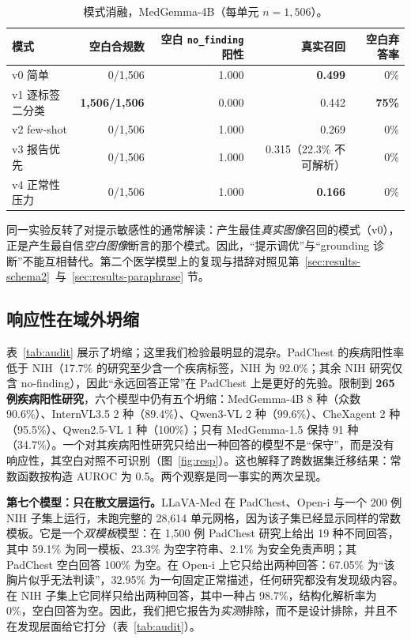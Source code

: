 \begin{table}[t]
\centering
\small
\caption{模式消融，MedGemma-4B（每单元 $n=1{,}506$）。}
\label{tab:schema}
\begin{tabular}{lrrrr}
\toprule
模式 & 空白合规数 & 空白 \texttt{no\_finding} 阳性 & 真实召回 & 空白弃答率 \\
\midrule
v0 简单 & 0/1,506 & 1.000 & \textbf{0.499} & 0\% \\
v1 逐标签二分类 & \textbf{1,506/1,506} & 0.000 & 0.442 & \textbf{75\%} \\
v2 few-shot & 0/1,506 & 1.000 & 0.269 & 0\% \\
v3 报告优先 & 0/1,506 & 1.000 & 0.315（22.3\% 不可解析） & 0\% \\
v4 正常性压力 & 0/1,506 & 1.000 & \textbf{0.166} & 0\% \\
\bottomrule
\end{tabular}
\end{table}

同一实验反转了对提示敏感性的通常解读：产生最佳\emph{真实图像}召回的模式（v0），正是产生最自信\emph{空白图像}断言的那个模式。因此，``提示调优''与``grounding 诊断''不能互相替代。第二个医学模型上的复现与措辞对照见第~\ref{sec:results-schema2}~与~\ref{sec:results-paraphrase} 节。

\subsection{响应性在域外坍缩}
\label{sec:results-collapse}

表~\ref{tab:audit} 展示了坍缩；这里我们检验最明显的混杂。PadChest 的疾病阳性率低于 NIH（17.7\% 的研究至少含一个疾病标签，NIH 为 92.0\%；其余 NIH 研究仅含 no-finding），因此``永远回答正常''在 PadChest 上是更好的先验。限制到 \textbf{265 例疾病阳性研究}，六个模型中仍有五个坍缩：MedGemma-4B 8 种（众数 90.6\%）、InternVL3.5 2 种（89.4\%）、Qwen3-VL 2 种（99.6\%）、CheXagent 2 种（95.5\%）、Qwen2.5-VL 1 种（100\%）；只有 MedGemma-1.5 保持 91 种（34.7\%）。一个对其疾病阳性研究只给出一种回答的模型不是``保守''，而是没有响应性，其空白对照不可识别（图~\ref{fig:resp}）。这也解释了跨数据集迁移结果：常数函数按构造 AUROC 为 0.5。两个观察是同一事实的两次呈现。

\textbf{第七个模型：只在散文层运行。}LLaVA-Med 在 PadChest、Open-i 与一个 200 例 NIH 子集上运行，未跑完整的 28,614 单元网格，因为该子集已经显示同样的常数模板。它是一个\emph{双模板}模型：在 1,500 例 PadChest 研究上给出 19 种不同回答，其中 59.1\% 为同一模板、23.3\% 为空字符串、2.1\% 为安全免责声明；其 PadChest 空白回答 100\% 为空。在 Open-i 上它只给出两种回答：67.05\% 为``该胸片似乎无法判读''，32.95\% 为一句固定正常描述，任何研究都没有发现级内容。在 NIH 子集上它同样只给出两种回答，其中一种占 98.7\%，结构化解析率为 0\%，空白回答为空。因此，我们把它报告为\emph{实测}排除，而不是设计排除，并且不在发现层面给它打分（表~\ref{tab:audit}）。

